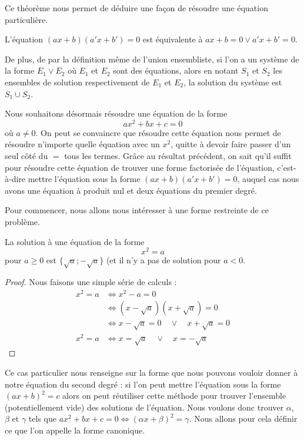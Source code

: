 Ce théorème nous permet de déduire une façon de résoudre une équation particulière.

\begin{prop}
    L'équation $(ax+b)(a'x+b')=0$ est équivalente à $ax+b=0\lor a'x+b'=0$.
\end{prop}

\begin{rmk}
    De plus, de par la définition même de l'union ensembliste, si l'on a un système de la forme $E_1\lor E_2$ où $E_1$ et $E_2$ sont des équations, alors en notant $S_1$ et $S_2$ les ensembles de solution respectivement de $E_1$ et $E_2$, la solution du système est $S_1\cup S_2$.
\end{rmk}

Nous souhaitons désormais résoudre une équation de la forme $$ax^2+bx+c=0$$ où $a\neq 0$. On peut se convaincre que résoudre cette équation nous permet de résoudre n'importe quelle équation avec un $x^2$, quitte à devoir faire passer d'un seul côté du \og$=$\fg{} tous les termes. Grâce au résultat précédent, on sait qu'il suffit pour résoudre cette équation de trouver une forme factorisée de l'équation, c'est-à-dire mettre l'équation sous la forme $(ax+b)(a'x+b')=0$, auquel cas nous avons une équation à produit nul et deux équations du premier degré.

Pour commencer, nous allons nous intéresser à une forme restreinte de ce problème.

\begin{prop}\label{utile1}
    La solution à une équation de la forme $$x^2=a$$ pour $a\geq0$ est $\{\sqrt a;-\sqrt a\}$ (et il n'y a pas de solution pour $a<0$.
\end{prop}
\begin{proof}
    Nous faisons une simple série de calculs :
    \begin{align*}
        x^2=a & \iff x^2-a=0\\
        &\iff (x-\sqrt{a})(x+\sqrt a)=0\\
        &\iff x-\sqrt a = 0 \quad \lor\quad  x+\sqrt a = 0\\
        x^2=a&\iff x=\sqrt a \quad \lor\quad  x = -\sqrt a
    \end{align*}
\end{proof}

Ce cas particulier nous renseigne sur la forme que nous pouvons vouloir donner à notre équation du second degré : si l'on peut mettre l'équation sous la forme $(ax+b)^2=c$ alors on peut réutiliser cette méthode pour trouver l'ensemble (potentiellement vide) des solutions de l'équation. Nous voulons donc trouver $\alpha$, $\beta$ et $\gamma$ tels que $ax^2+bx+c=0\iff (\alpha x + \beta)^2=\gamma$. Nous allons pour cela définir ce que l'on appelle la forme canonique.

